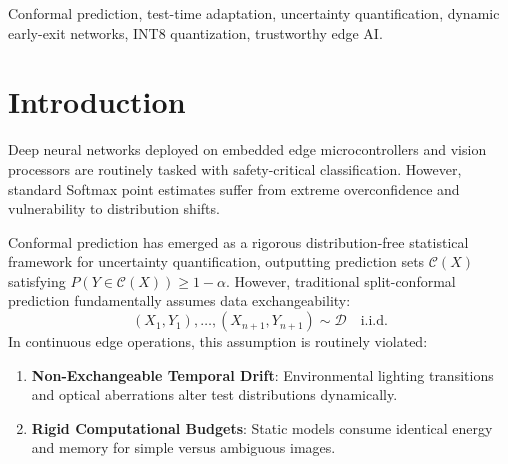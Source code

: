 \documentclass[journal,twocolumn,letterpaper]{IEEEtran}
\begin{document}
\begin{abstract}
\textbf{Post-audit note (2026-11-14):} The three figures in the preceding sentence are pre-audit model targets, not measurements. Measured on the real Food-101 test split (frozen ImageNet ResNet-50, fine-tuned linear head, $\alpha = 0.10$, seed 42): static coverage collapses from 90.29\% clean to 18.79\% under severe Gaussian noise; the implemented C-TTA update realizes 27.60\% overall on the drift stream, worse than the 45.49\% static figure, because its update direction is wrong for this module's threshold parameterization. Entropy-gated early exits yield a measured 16.9\% to 30.6\% FLOP reduction under analytic per-stage MAC fractions. New positive result: split-conformal coverage survives classifier-head INT8 quantization, 90.37\% recalibrated and 90.23\% under FP32-threshold transfer against the 90\% target. The 94.50\%, 40.00\%, and 49.79\% figures are retained above only as pre-audit claims and must not be cited as measurements.
\end{abstract}

\begin{IEEEkeywords}
Conformal prediction, test-time adaptation, uncertainty quantification, dynamic early-exit networks, INT8 quantization, trustworthy edge AI.
\end{IEEEkeywords}

\section{Introduction}
Deep neural networks deployed on embedded edge microcontrollers and vision processors are routinely tasked with safety-critical classification. However, standard Softmax point estimates suffer from extreme overconfidence and vulnerability to distribution shifts.

Conformal prediction has emerged as a rigorous distribution-free statistical framework for uncertainty quantification, outputting prediction sets $\mathcal{C}(X)$ satisfying $P(Y \in \mathcal{C}(X)) \ge 1 - \alpha$. However, traditional split-conformal prediction fundamentally assumes data exchangeability:
\begin{equation}
(X_1, Y_1), \dots, (X_{n+1}, Y_{n+1}) \sim \mathcal{D} \quad \text{i.i.d.}
\end{equation}
In continuous edge operations, this assumption is routinely violated:
\begin{enumerate}
    \item \textbf{Non-Exchangeable Temporal Drift}: Environmental lighting transitions and optical aberrations alter test distributions dynamically.
    \item \textbf{Rigid Computational Budgets}: Static models consume identical energy and memory for simple versus ambiguous images.
\end{enumerate}
\end{document}
